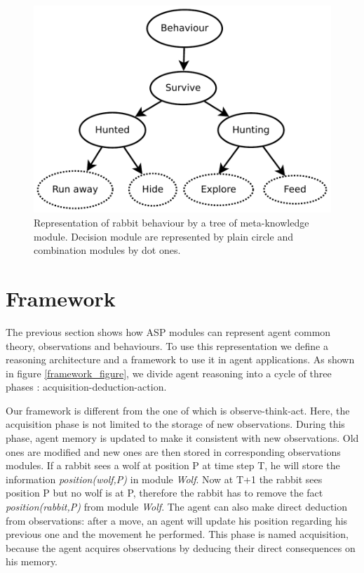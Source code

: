 \documentclass{aamas2012}
\begin{document}
	\begin{figure}
		\centering
		\includegraphics[keepaspectratio=true, scale=0.5]{behaviour_tree.pdf}
		\caption
		{
			\label{behaviour_tree}
			Representation of rabbit behaviour by a tree of meta-knowledge module.
			Decision module are represented by plain circle and combination modules by dot ones.
		}
	\end{figure}
	
\section{Framework}

	The previous section shows how ASP modules can represent agent common theory, observations and behaviours.
	To use this representation we define a reasoning architecture and a framework to use it in agent applications.
	As shown in figure \ref{framework_figure}, we divide agent reasoning into a cycle of three phases : acquisition-deduction-action.
	
	Our framework is different from the one of \cite{DBLP:journals/amai/KowalskiS99} which is observe-think-act.
	Here, the acquisition phase is not limited to the storage of new observations.
	During this phase, agent memory is updated to make it consistent with new observations.
	Old ones are modified and new ones are then stored in corresponding observations modules.
	If a rabbit sees a wolf at position P at time step T, he will store the information \emph{position(wolf,P)} in module \emph{Wolf}.
	Now at T+1 the rabbit sees position P but no wolf is at P, therefore the rabbit has to remove the fact \emph{position(rabbit,P)} from module \emph{Wolf}.
	The agent can also make direct deduction from observations: after a move, an agent will update his position regarding his previous one and the movement he performed.
	This phase is named acquisition, because the agent acquires observations by deducing their direct consequences on his memory.
	
\end{document}
